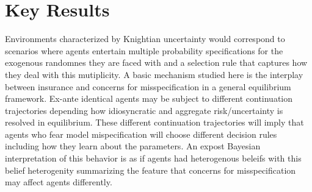 \documentclass[12pt]{article}
\begin{document}


\section{Key Results}
\noindent Environments characterized by Knightian uncertainty would correspond to scenarios where agents entertain multiple probability specifications for the exogenous randomnes they are faced with and a selection rule that captures how they deal with this mutiplicity. 
A basic mechanism studied here is the interplay between insurance and concerns for misspecification  in a general equilibrium framework. Ex-ante identical agents may be subject to different continuation trajectories depending how idiosyncratic and aggregate risk/uncertainty is resolved in equilibrium. These different continuation trajectories will imply that agents who fear model mispecification will choose different decision rules including how they learn about the parameters. An expost Bayesian interpretation of this behavior is as if agents had heterogenous beleifs with this belief heterogenity summarizing the feature that concerns for misspecification may affect agents differently. 
\end{document}

